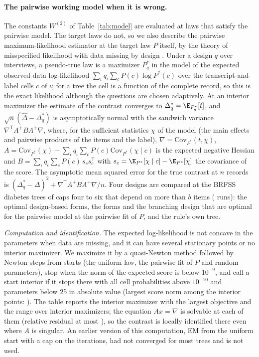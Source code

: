 \paragraph{The pairwise working model when it is wrong.}\label{app:misspec}
The constants $W^{(2)}$ of Table~\ref{tab:model} are evaluated at laws that satisfy the pairwise model. The target laws do not, so we also describe the pairwise maximum-likelihood estimator at the target law $P$ itself, by the theory of misspecified likelihood with data missing by design \citep{white1982,golden2019}. Under a design $q$ over interviews, a pseudo-true law is a maximizer $P^\ast_q$ in the model of the expected observed-data log-likelihood $\sum_\iota q_\iota\sum_c P(c)\log P^\ast(c)$ over the transcript-and-label cells $c$ of $\iota$; for a tree the cell is a function of the complete record, so this is the exact likelihood although the questions are chosen adaptively. At an interior maximizer the estimate of the contrast converges to $\Delta^\ast_q=\E_{P^\ast_q}[t]$, and $\sqrt n(\hat\Delta-\Delta^\ast_q)$ is asymptotically normal with the sandwich variance $\nabla^{\mathsf T}A^{+}BA^{+}\nabla$, where, for the sufficient statistics $\chi$ of the model (the main effects and pairwise products of the items and the label), $\nabla=\mathrm{Cov}_{P^\ast}(t,\chi)$, $A=\mathrm{Cov}_{P^\ast}(\chi)-\sum_\iota q_\iota\sum_cP(c)\mathrm{Cov}_{P^\ast}(\chi\mid c)$ is the expected negative Hessian and $B=\sum_\iota q_\iota\sum_cP(c)\,s_cs_c^{\mathsf T}$ with $s_c=\E_{P^\ast}[\chi\mid c]-\E_{P^\ast}[\chi]$ the covariance of the score. The asymptotic mean squared error for the true contrast at $n$ records is $(\Delta^\ast_q-\Delta)^2+\nabla^{\mathsf T}A^{+}BA^{+}\nabla/n$. Four designs are compared at the BRFSS diabetes trees of caps four to six that depend on more than $b$ items (\nMisRuns{} runs): the optimal design-based forms, the forms and the branching design that are optimal for the pairwise model at the pairwise fit of $P$, and the rule's own tree.

\emph{Computation and identification.} The expected log-likelihood is not concave in the parameters when data are missing, and it can have several stationary points or no interior maximizer. We maximize it by a quasi-Newton method followed by Newton steps from \nMisStarts{} starts (the uniform law, the pairwise fit of $P$ and random parameters), stop when the norm of the expected score is below $10^{-9}$, and call a start interior if it stops there with all cell probabilities above $10^{-10}$ and parameters below 25 in absolute value (largest score norm among the interior points: \nMisGnorm). The table reports the interior maximizer with the largest objective and the range over interior maximizers; the equation $Ax=\nabla$ is solvable at each of them (relative residual at most \nMisResid), so the contrast is locally identified there even where $A$ is singular. An earlier version of this computation, EM from the uniform start with a cap on the iterations, had not converged for most trees and is not used.

\nMisspecAppendixText

